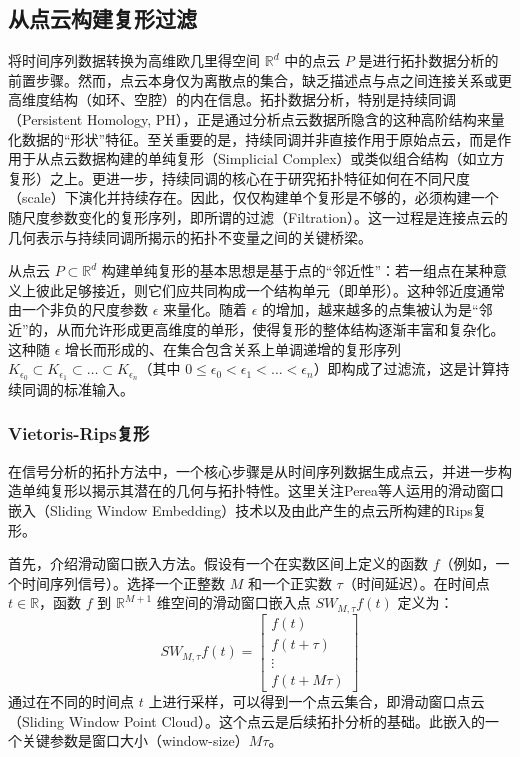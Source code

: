 \subsection{从点云构建复形过滤}
将时间序列数据转换为高维欧几里得空间 $\mathbb{R}^d$ 中的点云 $P$ 是进行拓扑数据分析的前置步骤。然而，点云本身仅为离散点的集合，缺乏描述点与点之间连接关系或更高维度结构（如环、空腔）的内在信息。拓扑数据分析，特别是持续同调（Persistent Homology, PH），正是通过分析点云数据所隐含的这种高阶结构来量化数据的“形状”特征。至关重要的是，持续同调并非直接作用于原始点云，而是作用于从点云数据构建的单纯复形（Simplicial Complex）或类似组合结构（如立方复形）之上。更进一步，持续同调的核心在于研究拓扑特征如何在不同尺度（scale）下演化并持续存在。因此，仅仅构建单个复形是不够的，必须构建一个随尺度参数变化的复形序列，即所谓的过滤（Filtration）。这一过程是连接点云的几何表示与持续同调所揭示的拓扑不变量之间的关键桥梁。

从点云 $P \subset \mathbb{R}^d$ 构建单纯复形的基本思想是基于点的“邻近性”：若一组点在某种意义上彼此足够接近，则它们应共同构成一个结构单元（即单形）。这种邻近度通常由一个非负的尺度参数 $\epsilon$ 来量化。随着 $\epsilon$ 的增加，越来越多的点集被认为是“邻近”的，从而允许形成更高维度的单形，使得复形的整体结构逐渐丰富和复杂化。这种随 $\epsilon$ 增长而形成的、在集合包含关系上单调递增的复形序列 $K_{\epsilon_0} \subset K_{\epsilon_1} \subset \dots \subset K_{\epsilon_n}$（其中 $0 \le \epsilon_0 < \epsilon_1 < \dots < \epsilon_n$）即构成了过滤流，这是计算持续同调的标准输入。

\subsubsection{Vietoris-Rips复形}
在信号分析的拓扑方法中，一个核心步骤是从时间序列数据生成点云，并进一步构造单纯复形以揭示其潜在的几何与拓扑特性。这里关注Perea等人\cite{perea2015sliding}运用的滑动窗口嵌入（Sliding Window Embedding）技术以及由此产生的点云所构建的Rips复形。

首先，介绍滑动窗口嵌入方法。假设有一个在实数区间上定义的函数 $f$（例如，一个时间序列信号）。选择一个正整数 $M$ 和一个正实数 $\tau$（时间延迟）。在时间点 $t \in \mathbb{R}$，函数 $f$ 到 $\mathbb{R}^{M+1}$ 维空间的滑动窗口嵌入点 $SW_{M,\tau}f(t)$ 定义为：
\begin{equation}
    SW_{M,\tau}f(t) = \begin{bmatrix} f(t) \\ f(t+\tau) \\ \vdots \\ f(t+M\tau) \end{bmatrix}
\end{equation}
通过在不同的时间点 $t$ 上进行采样，可以得到一个点云集合，即滑动窗口点云（Sliding Window Point Cloud）。这个点云是后续拓扑分析的基础。此嵌入的一个关键参数是窗口大小（window-size）$M\tau$。

